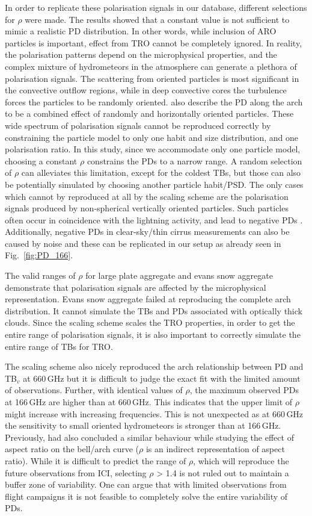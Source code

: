 \documentclass[amt, manuscript]{copernicus}
\begin{document}
In order to replicate these polarisation signals in our database,  different selections for $\rho$ were made. The results showed that a constant value is not sufficient to mimic a realistic PD distribution. In other words, while inclusion of ARO particles is important, effect from TRO cannot be completely ignored. In reality, the polarisation patterns depend on the microphysical properties, and the complex mixture of hydrometeors in the atmosphere can generate a plethora of polarisation signals. The scattering from oriented particles is most significant in the convective outflow regions, while in deep convective cores the turbulence forces the particles to be randomly oriented. \citet{gong:micro:17} also describe the PD along the arch to be a combined effect of randomly and horizontally oriented particles. These wide spectrum of polarisation signals cannot be reproduced correctly by constraining the particle model to only one habit and size distribution, and one polarisation ratio. In this study, since we accommodate only one particle model, choosing a constant $\rho$ constrains the PDs to a narrow range. A random selection of $\rho$ can alleviates this limitation, except for the coldest TBs, but those can also be potentially simulated by choosing another particle habit/PSD. The only cases which cannot by reproduced at all by the scaling scheme are the polarisation signals produced by non-spherical vertically oriented particles. Such particles often occur in coincidence with the lightning activity, and lead to negative PDs \citep{prigent:relat:05}. Additionally, negative PDs in clear-sky/thin cirrus measurements can also be caused by noise and these can be replicated in our setup as already seen in Fig.~\ref{fig:PD_166}.  

The valid ranges of $\rho$ for large plate aggregate and evans snow aggregate demonstrate that polarisation signals are affected by the microphysical representation. Evans snow aggregate failed at reproducing the complete arch distribution. It cannot simulate the TBs and PDs associated with optically thick clouds. Since the scaling scheme scales the TRO properties, in order to get the entire range of polarisation signals, it is also important to correctly simulate the  entire range of TBs for TRO.

The scaling scheme also nicely reproduced the arch relationship between PD and TB$_v$ at 660\,GHz but it is difficult to judge the exact fit with the limited amount of observations. Further, with identical values of $\rho$, the maximum observed PDs at 166\,GHz are higher than at 660\,GHz. This indicates that the upper limit of $\rho$ might increase with increasing frequencies. This is not unexpected as at 660\,GHz the sensitivity to small oriented hydrometeors is stronger than at 166\,GHz. Previously, \citet{gong:micro:17} had also concluded a similar behaviour while studying the effect of aspect ratio on the bell/arch curve ($\rho$ is an indirect representation of aspect ratio). While it is difficult to predict the range of $\rho$, which will reproduce the future observations from ICI, selecting $\rho$ > 1.4 is not ruled out to maintain a buffer zone of variability. One can argue that with limited observations from flight campaigns it is not feasible to completely solve the entire variability of PDs. 
\end{document}
